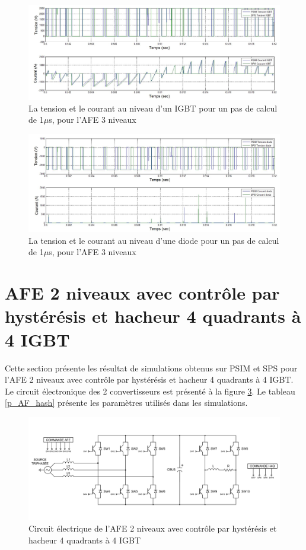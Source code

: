 \begin{figure}[htb]
\centering
\includegraphics[scale=0.5]{fig/AFE3LEVEL/1u/IGBT.jpg}
\caption{La tension et le courant au niveau d'un IGBT pour un pas de calcul de 1$\mu$s, pour l'AFE 3 niveaux}
\label{AF_3_IGBT}
\end{figure}

\begin{figure}[htb]
\centering
\includegraphics[scale=0.5]{fig/AFE3LEVEL/1u/DIODE.jpg}
\caption{La tension et le courant au niveau d'une diode pour un pas de calcul de 1$\mu$s, pour l'AFE 3 niveaux}
\label{AF_3_DIODE}
\end{figure}


\clearpage
\section{AFE 2 niveaux avec contrôle par hystérésis et hacheur 4 quadrants à 4 IGBT}
Cette section présente les résultat de simulations obtenus sur PSIM et SPS pour l'AFE 2 niveaux avec contrôle par hystérésis et hacheur 4 quadrants à 4 IGBT. Le circuit électronique des 2 convertisseurs est présenté à la figure \ref{circuit_H4Q_AFE_2L_RC}. Le tableau \ref{p_AF_hash} présente les paramètres utilisés dans les simulations.

\begin{figure}[htb]
\centering
\includegraphics[scale=0.6]{fig/H4Q_AFE_2L_RC.png}
\caption{Circuit électrique de l'AFE 2 niveaux avec contrôle par hystérésis et hacheur 4 quadrants à 4 IGBT}
\label{circuit_H4Q_AFE_2L_RC}
\end{figure}


